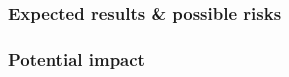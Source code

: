 \documentclass[a4paper,10pt]{article}
\begin{document}
\subsubsection{Expected results \& possible risks}
\label{sec:org58e0732}


\subsubsection{Potential impact}
\label{sec:org5358d99}





\end{document}
